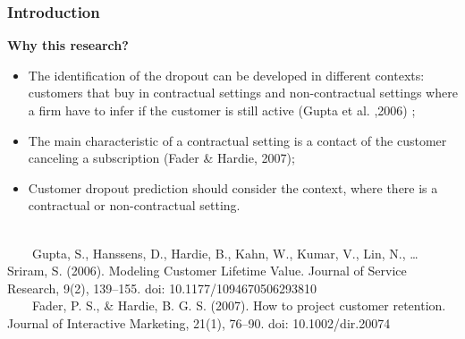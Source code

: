 \documentclass[10pt]{beamer}
\begin{document}
\begin{frame}
	\frametitle{Introduction}
	\Large
	\textbf{Why this research?}\\
		\begin{itemize} \normalsize
			\item The identification of the dropout can be developed in different contexts: customers that buy in contractual settings and non-contractual settings where a firm have to infer if the customer is still active \footnotesize(Gupta et al. ,2006) \normalsize;
			\item The main characteristic of a contractual setting is a contact of the customer canceling a subscription \footnotesize(Fader \& Hardie, 2007)\normalsize;
			\item Customer dropout prediction should consider the context, where there is a contractual or non-contractual setting. \\~\\
		\end{itemize}	
	\tiny
	~~~~Gupta, S., Hanssens, D., Hardie, B., Kahn, W., Kumar, V., Lin, N., … Sriram, S. (2006). Modeling Customer Lifetime Value. Journal of Service Research, 9(2), 139–155. doi: 10.1177/1094670506293810 \\
	~~~~Fader, P. S., \& Hardie, B. G. S. (2007). How to project customer retention. Journal of Interactive Marketing, 21(1), 76–90. doi: 10.1002/dir.20074\\
\end{frame}

\end{document}
